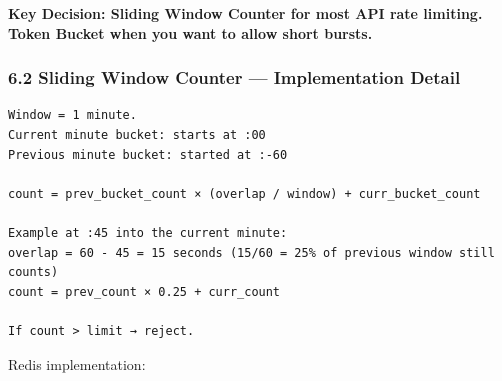 \documentclass[11pt]{article}
\begin{document}
\textbf{Key Decision: Sliding Window Counter for most API rate limiting. Token Bucket when you want to allow short bursts.}

\subsubsection{6.2 Sliding Window Counter --- Implementation Detail}\label{62-sliding-window-counter--implementation-detail}

\setcodelang{}

\begin{verbatim}
Window = 1 minute.
Current minute bucket: starts at :00
Previous minute bucket: started at :-60

count = prev_bucket_count × (overlap / window) + curr_bucket_count

Example at :45 into the current minute:
overlap = 60 - 45 = 15 seconds (15/60 = 25% of previous window still counts)
count = prev_count × 0.25 + curr_count

If count > limit → reject.
\end{verbatim}

Redis implementation:

\end{document}
